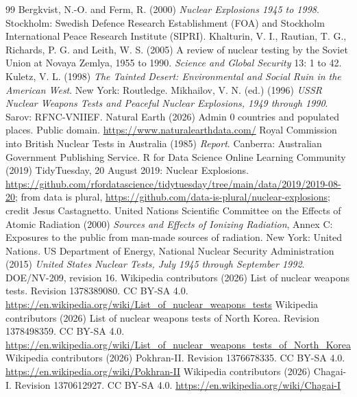 \documentclass[11pt,a4paper]{article}
\begin{document}
\begin{thebibliography}{99}
 Bergkvist, N.-O. and Ferm, R. (2000) \emph{Nuclear Explosions 1945 to 1998}. Stockholm: Swedish Defence Research Establishment (FOA) and Stockholm International Peace Research Institute (SIPRI).
 Khalturin, V. I., Rautian, T. G., Richards, P. G. and Leith, W. S. (2005) A review of nuclear testing by the Soviet Union at Novaya Zemlya, 1955 to 1990. \emph{Science and Global Security} 13: 1 to 42.
 Kuletz, V. L. (1998) \emph{The Tainted Desert: Environmental and Social Ruin in the American West}. New York: Routledge.
 Mikhailov, V. N. (ed.) (1996) \emph{USSR Nuclear Weapons Tests and Peaceful Nuclear Explosions, 1949 through 1990}. Sarov: RFNC-VNIIEF.
 Natural Earth (2026) Admin 0 countries and populated places. Public domain. \url{https://www.naturalearthdata.com/}
 Royal Commission into British Nuclear Tests in Australia (1985) \emph{Report}. Canberra: Australian Government Publishing Service.
 R for Data Science Online Learning Community (2019) TidyTuesday, 20 August 2019: Nuclear Explosions. \url{https://github.com/rfordatascience/tidytuesday/tree/main/data/2019/2019-08-20}; from data is plural, \url{https://github.com/data-is-plural/nuclear-explosions}; credit Jesus Castagnetto.
 United Nations Scientific Committee on the Effects of Atomic Radiation (2000) \emph{Sources and Effects of Ionizing Radiation}, Annex C: Exposures to the public from man-made sources of radiation. New York: United Nations.
 US Department of Energy, National Nuclear Security Administration (2015) \emph{United States Nuclear Tests, July 1945 through September 1992}. DOE/NV-209, revision 16.
 Wikipedia contributors (2026) List of nuclear weapons tests. Revision 1378389080. CC BY-SA 4.0. \url{https://en.wikipedia.org/wiki/List_of_nuclear_weapons_tests}
 Wikipedia contributors (2026) List of nuclear weapons tests of North Korea. Revision 1378498359. CC BY-SA 4.0. \url{https://en.wikipedia.org/wiki/List_of_nuclear_weapons_tests_of_North_Korea}
 Wikipedia contributors (2026) Pokhran-II. Revision 1376678335. CC BY-SA 4.0. \url{https://en.wikipedia.org/wiki/Pokhran-II}
 Wikipedia contributors (2026) Chagai-I. Revision 1370612927. CC BY-SA 4.0. \url{https://en.wikipedia.org/wiki/Chagai-I}
\end{thebibliography}
\end{document}
